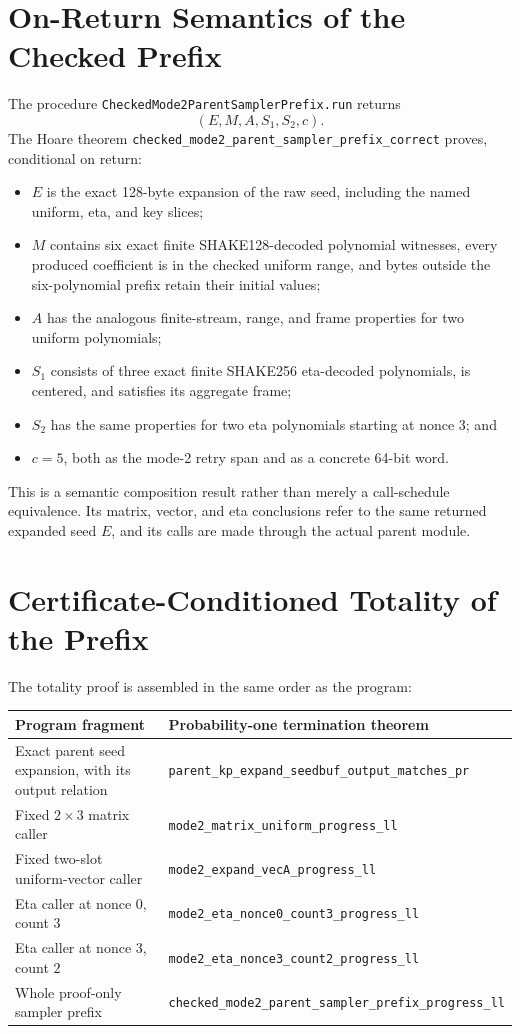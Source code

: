 \documentclass[11pt]{article}
\theoremstyle{definition}
\theoremstyle{plain}
\theoremstyle{remark}
\newcommand{\code}[1]{\nolinkurl{#1}}
\begin{document}
\section{On-Return Semantics of the Checked Prefix}

The procedure \code{CheckedMode2ParentSamplerPrefix.run} returns
\[
 (E,M,A,S_1,S_2,c).
\]
The Hoare theorem
\code{checked_mode2_parent_sampler_prefix_correct} proves, conditional on
return:
\begin{itemize}
\item \(E\) is the exact 128-byte expansion of the raw seed, including the
  named uniform, eta, and key slices;
\item \(M\) contains six exact finite SHAKE128-decoded polynomial witnesses,
  every produced coefficient is in the checked uniform range, and bytes
  outside the six-polynomial prefix retain their initial values;
\item \(A\) has the analogous finite-stream, range, and frame properties for
  two uniform polynomials;
\item \(S_1\) consists of three exact finite SHAKE256 eta-decoded polynomials,
  is centered, and satisfies its aggregate frame;
\item \(S_2\) has the same properties for two eta polynomials starting at
  nonce \(3\); and
\item \(c=5\), both as the mode-2 retry span and as a concrete 64-bit word.
\end{itemize}

This is a semantic composition result rather than merely a call-schedule
equivalence.  Its matrix, vector, and eta conclusions refer to the same
returned expanded seed \(E\), and its calls are made through the actual parent
module.

\section{Certificate-Conditioned Totality of the Prefix}

The totality proof is assembled in the same order as the program:
\begin{center}
\begin{tabularx}{\textwidth}{>{\raggedright\arraybackslash}p{}X}
\toprule
Program fragment & Probability-one termination theorem\\
\midrule
Exact parent seed expansion, with its output relation &
\code{parent_kp_expand_seedbuf_output_matches_pr}\\
Fixed \(2\times3\) matrix caller &
\code{mode2_matrix_uniform_progress_ll}\\
Fixed two-slot uniform-vector caller &
\code{mode2_expand_vecA_progress_ll}\\
Eta caller at nonce \(0\), count \(3\) &
\code{mode2_eta_nonce0_count3_progress_ll}\\
Eta caller at nonce \(3\), count \(2\) &
\code{mode2_eta_nonce3_count2_progress_ll}\\
Whole proof-only sampler prefix &
\code{checked_mode2_parent_sampler_prefix_progress_ll}\\
\bottomrule
\end{tabularx}
\end{center}
\end{document}
